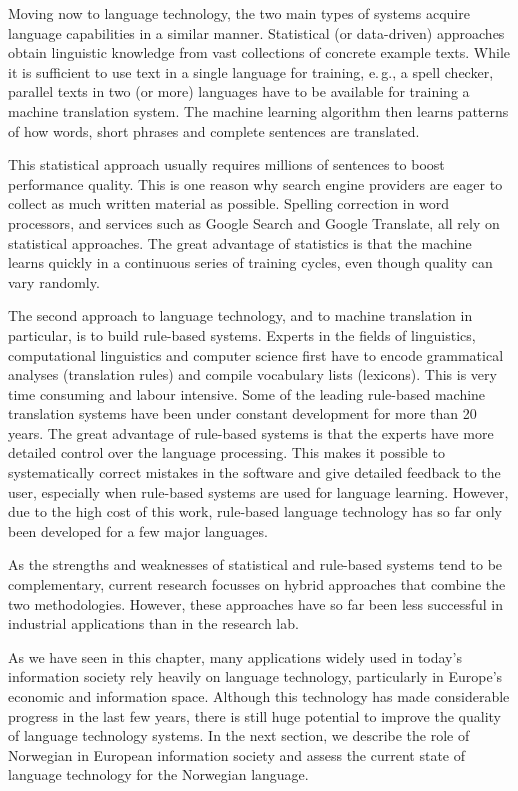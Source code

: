 \begin{multicols}{2}
Moving now to language technology, the two main types of systems acquire language capabilities in a similar manner. Statistical (or data-driven) approaches obtain linguistic knowledge from vast collections of concrete example texts. While it is sufficient to use text in a single language for training, e.\,g., a spell checker, parallel texts in two (or more) languages have to be available for training a machine translation system. The machine learning algorithm then learns patterns of how words, short phrases and complete sentences are translated. 

This statistical approach usually requires millions of sentences to boost performance quality. This is one reason why search engine providers are eager to collect as much written material as possible. Spelling correction in word processors, and services such as Google Search and Google Translate, all rely on statistical approaches. The great advantage of statistics is that the machine learns quickly in a continuous series of training cycles, even though quality can vary randomly.

The second approach to language technology, and to machine translation in particular, is to build rule-based systems. Experts in the fields of linguistics, computational linguistics and computer science first have to encode grammatical analyses (translation rules) and compile vocabulary lists (lexicons). This is very time consuming and labour intensive. Some of the leading rule-based machine translation systems have been under constant development for more than 20 years. The great advantage of rule-based systems is that the experts have more detailed control over the language processing. This makes it possible to systematically correct mistakes in the software and give detailed feedback to the user, especially when rule-based systems are used for language learning. However, due to the high cost of this work, rule-based language technology has so far only been developed for a few major languages. 


As the strengths and weaknesses of statistical and rule-based systems tend to be complementary, current research focusses on hybrid approaches that combine the two methodologies. However, these approaches have so far been less successful in industrial applications than in the research lab. 

As we have seen in this chapter, many applications widely used in today’s information society rely heavily on language technology, particularly in Europe’s economic and information space. Although this technology has made considerable progress in the last few years, there is still huge potential to improve the quality of language technology systems. In the next section, we describe the role of 
Norwegian in European information society and assess the current state of language technology for the Norwegian language.
\end{multicols}

